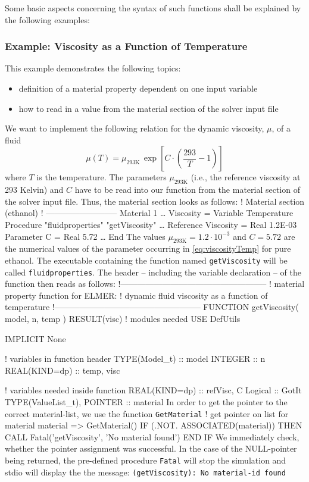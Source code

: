 Some basic aspects concerning the syntax of such functions shall be explained by the following examples:

\subsubsection{Example: Viscosity as a Function of Temperature}
This example demonstrates the following topics:
\begin{itemize}
   \item definition of a material property dependent on one input variable
   \item how to read in a value from the material section of the solver input file
\end{itemize}
\noindent We want to implement the following relation for the dynamic viscosity, $\mu$, of a fluid
\begin{equation}
  \label{eq:viscosityTemp}
  \mu(T) = \mu_{293 \textrm{K}}\, \exp\left[C\cdot\left(\frac{293}{T} - 1\right)\right]
\end{equation}
where $T$ is the temperature. The parameters $\mu_{293 \textrm{K}}$ (i.e., the reference viscosity at 293 Kelvin) and $C$ have to be read into our function from the material section of the solver input file. Thus, the material section looks as follows:
\ttbegin
! Material section (ethanol)
! --------------------------
Material 1
  \ldots
  Viscosity = Variable Temperature
  Procedure "fluidproperties" "getViscosity"
  \ldots
  Reference Viscosity = Real 1.2E-03
  Parameter C = Real 5.72
  \ldots
End
\ttend
The values $\mu_{293 \textrm{K}} = 1.2\cdot 10^{-3}$ and $C=5.72$ are the numerical values of the parameter occurring in \eqref{eq:viscosityTemp} for pure ethanol. The executable containing the function named \texttt{getViscosity} will be called \texttt{fluidproperties}. The header -- including the variable declaration -- of the function then reads as follows:
\ttbegin
!-----------------------------------------------------
! material property function for ELMER:
! dynamic fluid viscosity as a function of temperature 
!-----------------------------------------------------
FUNCTION getViscosity( model, n, temp ) RESULT(visc)
  ! modules needed
  USE DefUtils

  IMPLICIT None

  ! variables in function header
  TYPE(Model_t) :: model
  INTEGER :: n
  REAL(KIND=dp) :: temp, visc

  ! variables needed inside function
  REAL(KIND=dp) :: refVisc, C
  Logical :: GotIt
  TYPE(ValueList_t), POINTER :: material
\ttend
In order to get the pointer to the correct material-list, we use the function \texttt{GetMaterial}
\ttbegin
  ! get pointer on list for material
  material => GetMaterial()
  IF (.NOT. ASSOCIATED(material)) THEN
     CALL Fatal('getViscosity', 'No material found')
  END IF
\ttend
We immediately check, whether the pointer assignment was successful. In the case of the NULL-pointer being returned, the pre-defined procedure \texttt{Fatal} will stop the simulation and stdio will display the the message: \texttt{(getViscosity): No material-id found}

